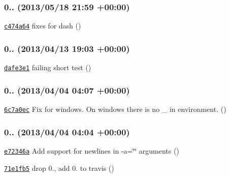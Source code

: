 \subsubsection*{0.. (2013/05/18 21\+:59 +00\+:00)}


\begin{DoxyItemize}
\item \href{https://github.com/bcoe/yargs/commit/c474a649231527915c222156e3b40806d365a87c}{\tt c474a64} fixes for dash ()
\end{DoxyItemize}

\subsubsection*{0.. (2013/04/13 19\+:03 +00\+:00)}


\begin{DoxyItemize}
\item \href{https://github.com/bcoe/yargs/commit/dafe3e18d7c6e7c2d68e06559df0e5cbea3adb14}{\tt dafe3e1} failing short test ()
\end{DoxyItemize}

\subsubsection*{0.. (2013/04/04 04\+:07 +00\+:00)}


\begin{DoxyItemize}
\item \href{https://github.com/bcoe/yargs/commit/6c7a0ec94ce4199a505f0518b4d6635d4e47cc81}{\tt 6c7a0ec} Fix for windows. On windows there is no \+\_\+ in environment. ()
\end{DoxyItemize}

\subsubsection*{0.. (2013/04/04 04\+:04 +00\+:00)}


\begin{DoxyItemize}
\item \href{https://github.com/bcoe/yargs/commit/e72346a727b7267af5aa008b418db89970873f05}{\tt e72346a} Add support for newlines in -\/a=\char`\"{}\char`\"{} arguments ()
\item \href{https://github.com/bcoe/yargs/commit/71e1fb55ea9987110a669ac6ec12338cfff3821c}{\tt 71e1fb5} drop 0., add 0. to travis ()
\end{DoxyItemize}

